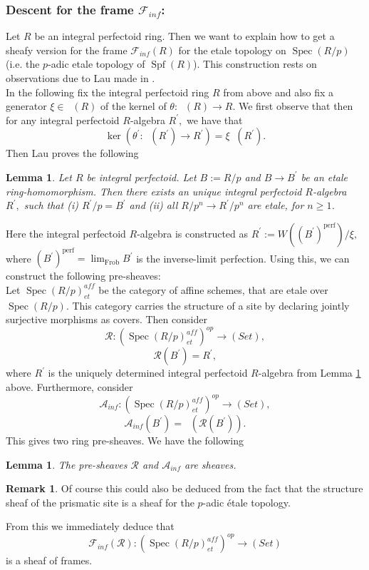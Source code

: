 \documentclass[a4paper,10,5 pt]{amsart}
\newtheorem{Lemma}[Satz]{Lemma}
\theoremstyle{definition}
\newtheorem{Remark}{Remark}
\DeclareMathOperator{\Spec}{Spec}
\DeclareMathOperator{\Spf}{Spf}
\DeclareMathOperator{\Ainf}{\mathbb{A}_{inf}}
\begin{document}
\subsubsection{Descent for the frame $\mathcal{F}_{inf}$:}
Let $R$ be an integral perfectoid ring. Then we want to explain how to get a sheafy version for the frame $\mathcal{F}_{inf}(R)$ for the etale topology on $\Spec(R/p)$ (i.e. the $p$-adic etale topology of $\Spf(R)$). This construction rests on observations due to Lau made in \cite{Lau perfektoid}.
\\
In the following fix the integral perfectoid ring $R$ from above and also fix a generator $\xi\in \Ainf(R)$ of the kernel of $\theta\colon \Ainf(R)\rightarrow R.$ We first observe that then for any integral perfectoid $R$-algebra $R^{\prime},$ we have that
$$ \ker(\theta^{\prime}\colon \Ainf(R^{\prime})\rightarrow R^{\prime})=\xi\Ainf(R^{\prime}).$$
Then Lau proves the following
\begin{Lemma}\label{Eindeutige integral perfektoide algebra}\cite[Lemma 8.10.]{Lau perfektoid}
Let $R$ be integral perfectoid. Let $B:=R/p$ and $B\rightarrow B^{\prime}$ be an etale ring-homomorphism. Then there exists an unique integral perfectoid $R$-algebra $R^{\prime},$ such that (i) $R^{\prime}/p=B^{\prime}$ and (ii) all $R/p^{n}\rightarrow R^{\prime}/p^{n}$ are etale, for $n\geq 1$.
\end{Lemma}
Here the integral perfectoid $R$-algebra is constructed as $R^{\prime}:=W((B^{\prime})^{\text{perf}})/\xi,$ where $(B^{\prime})^{\text{perf}}=\lim_{\text{Frob}}B^{\prime}$ is the inverse-limit perfection. Using this, we can construct the following pre-sheaves:
\\
Let $\Spec(R/p)^{aff}_{et}$ be the category of affine schemes, that are etale over $\Spec(R/p)$. This category carries the structure of a site by declaring jointly surjective morphisms as covers. Then consider
$$\mathcal{R}\colon (\Spec(R/p)^{aff}_{et})^{op}\rightarrow (Set),$$
$$\mathcal{R}(B^{\prime})=R^{\prime},$$
where $R^{\prime}$ is the uniquely determined integral perfectoid $R$-algebra from Lemma \ref{Eindeutige integral perfektoide algebra} above. Furthermore, consider 
$$\mathcal{A}_{inf}\colon (\Spec(R/p)^{aff}_{et})^{op}\rightarrow (Set),$$
$$\mathcal{A}_{inf}(B^{\prime})=\Ainf(\mathcal{R}(B^{\prime})).$$ This gives two ring pre-sheaves. We have the following
\begin{Lemma}\cite[Lemma 10.9]{Lau perfektoid}
 The pre-sheaves $\mathcal{R}$ and $\mathcal{A}_{inf}$ are sheaves.
\end{Lemma}
\begin{Remark}
Of course this could also be deduced from the fact that the structure sheaf of the prismatic site is a sheaf for the $p$-adic étale topology.
\end{Remark}
From this we immediately deduce that 
$$\mathcal{F}_{inf}(\mathcal{R})\colon (\Spec(R/p)^{aff}_{et})^{op}\rightarrow (Set)$$ is a sheaf of frames.
\end{document}

